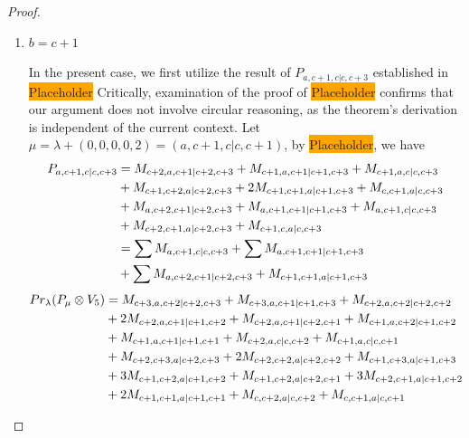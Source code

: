 \begin{proof}
\begin{enumerate}
\begin{enumerate}
    \item $b=c+1$ \par
        In the present case, we first utilize the result of $P_{a,c+1,c|c,c+3}$ established in \colorbox{orange}{Placeholder} Critically, examination of the proof of \colorbox{orange}{Placeholder} confirms that our argument does not involve circular reasoning, as the theorem's derivation is independent of the current context. Let $\mu = \lambda + (0,0,0,0,2) =(a,c+1,c|c,c+1) $, by \colorbox{orange}{Placeholder}, we have
\begin{equation}\notag
  \begin{aligned}
    P_{a,c+1,c|c,c+3} &= M_{c+2,a,c+1|c+2,c+3}
+M_{c+1,a,c+1|c+1,c+3}
+M_{c+1,a,c|c,c+3}\\
                                              &
+M_{c+1,c+2,a|c+2,c+3}
+2M_{c+1,c+1,a|c+1,c+3}
+M_{c,c+1,a|c,c+3}\\
                                              &
+M_{a,c+2,c+1|c+2,c+3}
+M_{a,c+1,c+1|c+1,c+3}
+M_{a,c+1,c|c,c+3}\\
                                              &
+M_{c+2,c+1,a|c+2,c+3}
+M_{c+1,c,a|c,c+3}\\
         &=
\sum M_{a,c+1,c|c,c+3}
+\sum M_{a,c+1,c+1|c+1,c+3}\\
                                              &
+\sum M_{a,c+2,c+1|c+2,c+3}
+ M_{c+1,c+1,a|c+1,c+3}
  \end{aligned}
\end{equation}
        \begin{equation}\notag
          \begin{aligned}
            Pr_{\lambda}(P_\mu \otimes V_{5}) &=
M_{c+3,a,c+2|c+2,c+3}
+ M_{c+3,a,c+1|c+1,c+3}
+ M_{c+2,a,c+2|c+2,c+2}\\
                                              &
+ 2M_{c+2,a,c+1|c+1,c+2}
+ M_{c+2,a,c+1|c+2,c+1}
+ M_{c+1,a,c+2|c+1,c+2}\\
                                              &
+ M_{c+1,a,c+1|c+1,c+1}
+ M_{c+2,a,c|c,c+2}
+ M_{c+1,a,c|c,c+1}\\
                                              &
+ M_{c+2,c+3,a|c+2,c+3}
+ 2M_{c+2,c+2,a|c+2,c+2}
+ M_{c+1,c+3,a|c+1,c+3}\\
                                              &
+ 3M_{c+1,c+2,a|c+1,c+2}
+ M_{c+1,c+2,a|c+2,c+1}
+ 3M_{c+2,c+1,a|c+1,c+2}\\
                                              &
+ 2M_{c+1,c+1,a|c+1,c+1}
+ M_{c,c+2,a|c,c+2}
+ M_{c,c+1,a|c,c+1}\\

\end{aligned}
\end{equation}
\end{enumerate}
\end{enumerate}
\end{proof}

